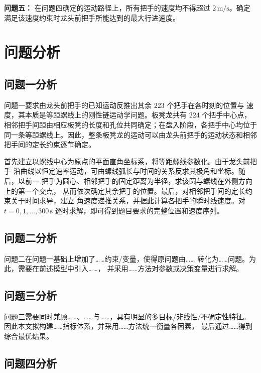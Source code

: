 \documentclass[UTF8,fontset=windows,a4paper,12pt]{ctexart}
\begin{document}
\textbf{问题五：} 在问题四确定的运动路径上，所有把手的速度均不得超过
$2\,\mathrm{m/s}$。确定满足该速度约束时龙头前把手所能达到的最大行进速度。


\section{问题分析}

\subsection{问题一分析}

问题一要求由龙头前把手的已知运动反推出其余 $223$ 个把手在各时刻的位置与
速度，其本质是等距螺线上的刚性链运动学问题。板凳龙共有 $224$ 个把手中心点，
相邻把手间距由相应板凳的长度和孔位共同确定；在盘入阶段，各把手中心均位于
同一条等距螺线上。因此，整条板凳龙的运动可以由龙头前把手的运动状态和相邻
把手间的定长约束逐节确定。

首先建立以螺线中心为原点的平面直角坐标系，将等距螺线参数化。由于龙头前把手
沿曲线以恒定速率运动，可由螺线弧长与时间的关系反求其极角和坐标。随后，以前一
把手为圆心、相邻把手的固定距离为半径，求该圆与螺线在外侧方向上的第一个交点，
从而依次确定其余把手的位置。最后，对相邻把手间的定长约束关于时间求导，建立
角速度递推关系，并据此计算各把手的瞬时线速度。对 $t=0,1,\ldots,300\,\mathrm{s}$
逐时求解，即可得到题目要求的完整位置和速度序列。

\subsection{问题二分析}

问题二在问题一基础上增加了……约束/变量，使得原问题由……
转化为……问题。为此，需要在前述模型中引入……，
并采用……方法对参数或决策变量进行求解。

\subsection{问题三分析}

问题三需要同时兼顾……、……与……，具有明显的多目标/非线性/不确定性特征。
因此本文拟构建……指标体系，并采用……方法统一衡量各因素，
最后通过……得到综合最优结果。

\subsection{问题四分析}
\end{document}
